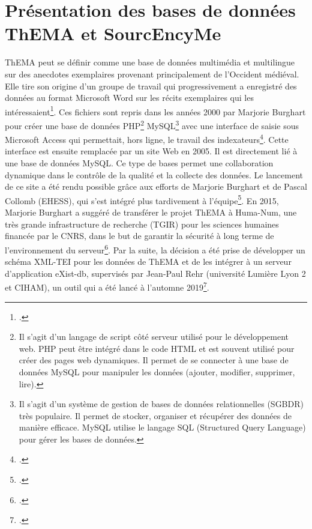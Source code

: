 \documentclass[a4paper,12pt,twoside]{book} %
\begin{document}
\section{Présentation des bases de données ThEMA et SourcEncyMe}
ThEMA peut se définir comme une base de données multimédia et multilingue sur des anecdotes exemplaires provenant principalement de l'Occident médiéval. Elle tire son origine d'un groupe de travail qui progressivement a enregistré des données au format Microsoft Word sur les récits exemplaires qui les intéressaient\footcite{rehrThesaurusExemplorumMedii2021a}. Ces fichiers sont repris dans les années 2000 par Marjorie Burghart pour créer une base de données PHP\footnote{Il s'agit d'un langage de script côté serveur utilisé pour le développement web. PHP peut être intégré dans le code HTML et est souvent utilisé pour créer des pages web dynamiques. Il permet de se connecter à une base de données MySQL pour manipuler les données (ajouter, modifier, supprimer, lire).} MySQL\footnote{Il s'agit d'un système de gestion de bases de données relationnelles (SGBDR) très populaire. Il permet de stocker, organiser et récupérer des données de manière efficace. MySQL utilise le langage SQL (Structured Query Language) pour gérer les bases de données.} avec une interface de saisie sous Microsoft Access qui permettait, hors ligne, le travail des indexateurs\footcite{burghartInformatisationThEMA2005}. Cette interface est ensuite remplacée par un site Web en 2005. Il est directement lié à une base de données MySQL. Ce type de bases permet une collaboration dynamique dans le contrôle de la qualité et la collecte des données. Le lancement de ce site a été rendu possible grâce aux efforts de Marjorie Burghart et de Pascal Collomb (EHESS), qui s'est intégré plus tardivement à l'équipe\footcite{rehrThesaurusExemplorumMedii2021a}. En 2015, Marjorie Burghart a suggéré de transférer le projet ThEMA à Huma-Num, une très grande infrastructure de recherche (TGIR) pour les sciences humaines financée par le CNRS, dans le but de garantir la sécurité à long terme de l'environnement du serveur\footcite{rehrThesaurusExemplorumMedii2021a}. Par la suite, la décision a été prise de développer un schéma XML-TEI pour les données de ThEMA et de les intégrer à un serveur d'application eXist-db, supervisés par Jean-Paul Rehr (université Lumière Lyon 2 et CIHAM), un outil qui a été lancé à l'automne 2019\footcite{rehrThesaurusExemplorumMedii2021a}.
\end{document}
